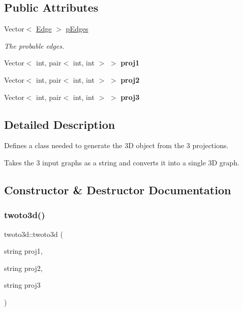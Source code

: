 \subsection*{Public Attributes}
\begin{DoxyCompactItemize}
\item 
\mbox{\label{classtwoto3d_aac049125c78347a681d29306dcb3b86d}} 
Vector$<$ \mbox{\hyperlink{struct_edge}{Edge}} $>$ \mbox{\hyperlink{classtwoto3d_aac049125c78347a681d29306dcb3b86d}{p\+Edges}}
\begin{DoxyCompactList}\small\item\em The probable edges. \end{DoxyCompactList}\item 
\mbox{\label{classtwoto3d_acc1927f1fc908a193935b0db3e2af9c9}} 
Vector$<$ int, pair$<$ int, int $>$ $>$ {\bfseries proj1}
\item 
\mbox{\label{classtwoto3d_a505bbfbc57914ea4d1ecbbcd133515a1}} 
Vector$<$ int, pair$<$ int, int $>$ $>$ {\bfseries proj2}
\item 
\mbox{\label{classtwoto3d_a3382e23847bbb572a2f1138a21ba116c}} 
Vector$<$ int, pair$<$ int, int $>$ $>$ {\bfseries proj3}
\end{DoxyCompactItemize}


\subsection{Detailed Description}
Defines a class needed to generate the 3D object from the 3 projections. 

Takes the 3 input graphs as a string and converts it into a single 3D graph. 

\subsection{Constructor \& Destructor Documentation}
\mbox{\label{classtwoto3d_a22a5092922477075c8676947551e9476}} 
\subsubsection{\texorpdfstring{twoto3d()}{twoto3d()}}
{\footnotesize\ttfamily twoto3d\+::twoto3d (\begin{DoxyParamCaption}\item[{string}]{proj1,  }\item[{string}]{proj2,  }\item[{string}]{proj3 }\end{DoxyParamCaption})}



